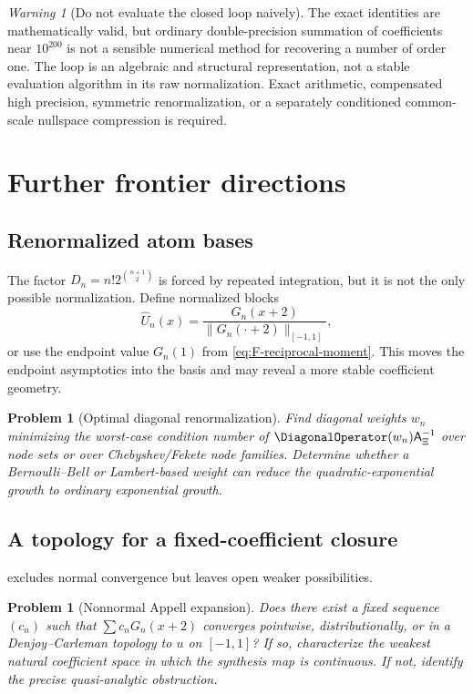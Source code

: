\documentclass[11pt,oneside]{article}
\newtheorem{problem}[theorem]{Problem}
\theoremstyle{definition}
\theoremstyle{remark}
\newtheorem{warning}[theorem]{Warning}
\begin{document}
\begin{warning}[Do not evaluate the closed loop naively]
The exact identities are mathematically valid, but ordinary double-precision
summation of coefficients near $10^{200}$ is not a sensible numerical method
for recovering a number of order one.  The loop is an algebraic and
structural representation, not a stable evaluation algorithm in its raw
normalization.  Exact arithmetic, compensated high precision, symmetric
renormalization, or a separately conditioned common-scale nullspace
compression is required.
\end{warning}

\section{Further frontier directions}

\subsection{Renormalized atom bases}
The factor $D_n=n!2^{\binom{n+1}{2}}$ is forced by repeated integration, but
it is not the only possible normalization.  Define normalized blocks
\begin{equation}
 \widehat U_n(x)=\frac{G_n(x+2)}{\|G_n(\cdot+2)\|_{[-1,1]}},
 \label{eq:normalized-blocks}
\end{equation}
or use the endpoint value $G_n(1)$ from
\eqref{eq:F-reciprocal-moment}.  This moves the endpoint asymptotics into the
basis and may reveal a more stable coefficient geometry.

\begin{problem}[Optimal diagonal renormalization]
Find diagonal weights $w_n$ minimizing the worst-case condition number of
$\DiagonalOperator(w_n)\mathsf A_\Xi^{-1}$ over node sets or over Chebyshev/Fekete node
families.  Determine whether a Bernoulli--Bell or Lambert-based weight can
reduce the quadratic-exponential growth to ordinary exponential growth.
\end{problem}

\subsection{A topology for a fixed-coefficient closure}
 excludes normal convergence but leaves open
weaker possibilities.

\begin{problem}[Nonnormal Appell expansion]
Does there exist a fixed sequence $(c_n)$ such that
$\sum c_nG_n(x+2)$ converges pointwise, distributionally, or in a
Denjoy--Carleman topology to $u$ on $[-1,1]$?  If so, characterize the weakest
natural coefficient space in which the synthesis map is continuous.  If
not, identify the precise quasi-analytic obstruction.
\end{problem}
\end{document}
